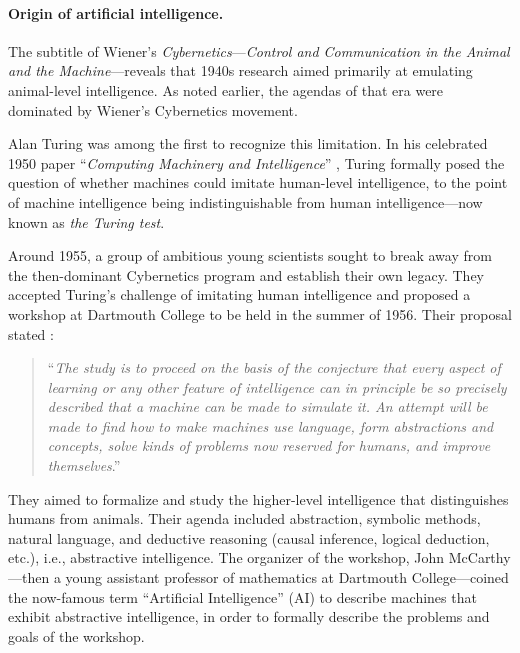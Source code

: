 \documentclass[../../book-main.tex]{subfiles}
\begin{document}
\paragraph{Origin of artificial intelligence.}
The subtitle of Wiener's \textit{Cybernetics}---\textit{Control and Communication in the Animal and the Machine}---reveals that 1940s research aimed primarily at emulating animal-level intelligence. As noted earlier, the agendas of that era were dominated by Wiener's Cybernetics movement.

Alan Turing was among the first to recognize this limitation. In his celebrated 1950 paper ``\textit{Computing Machinery and Intelligence}'' \cite{Turing-1950}, Turing formally posed the question of whether machines could imitate human-level intelligence, to the point of machine intelligence being indistinguishable from human intelligence---now known as \textit{the Turing test}.

Around 1955, a group of ambitious young scientists sought to break away from the then-dominant Cybernetics program and establish their own legacy. They accepted Turing's challenge of imitating human intelligence and proposed a workshop at Dartmouth College to be held in the summer of 1956. Their proposal stated \cite{McCarthy-1955}:
\begin{quote}
    ``\textit{The study is to proceed on the basis of the conjecture that every aspect of learning or any other feature of intelligence can in principle be so precisely described that a machine can be made to simulate it. An attempt will be made to find how to make machines use language, form abstractions and concepts, solve kinds of problems now reserved for humans, and improve themselves}.''
\end{quote}
They aimed to formalize and study the higher-level intelligence that distinguishes humans from animals. Their agenda included abstraction, symbolic methods, natural language, and deductive reasoning (causal inference, logical deduction, etc.), i.e., abstractive intelligence. The organizer of the workshop, John McCarthy---then a young assistant professor of mathematics at Dartmouth College---coined the now-famous term ``Artificial Intelligence'' (AI) to describe machines that exhibit abstractive intelligence, in order to formally describe the problems and goals of the workshop.
\end{document}
